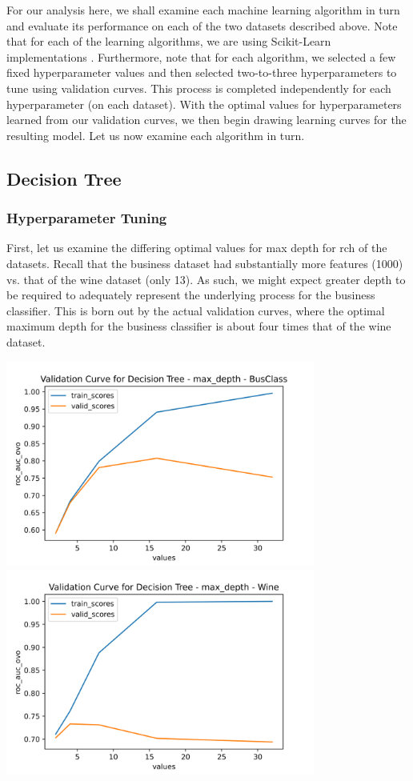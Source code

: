 \documentclass[
	letterpaper, %
]{jdf}
\begin{document}
For our analysis here, we shall examine each machine learning algorithm in turn and evaluate its performance on each of the two datasets described above. Note that for each of the learning algorithms, we are using Scikit-Learn implementations \citep{sklearn_api}. Furthermore, note that for each algorithm, we selected a few fixed hyperparameter values and then selected two-to-three hyperparameters to tune using validation curves. This process is completed independently for each hyperparameter (on each dataset). With the optimal values for hyperparameters learned from our validation curves, we then begin drawing learning curves for the resulting model. Let us now examine each algorithm in turn.


\subsection{Decision Tree}

\subsubsection{Hyperparameter Tuning}
First, let us examine the differing optimal values for max depth for rch of the datasets. Recall that the business dataset had substantially more features (1000) vs. that of the wine dataset (only 13). As such, we might expect greater depth to be required to adequately represent the underlying process for the business classifier. This is born out by the actual validation curves, where the optimal maximum depth for the business classifier is about four times that of the wine dataset.

\includegraphics[width=4in]{Figures/BusClass-0920/DT/val_curve_0.png}
\includegraphics[width=4in]{Figures/Wine-0921/DT/val_curve_0.png}
\end{document}

